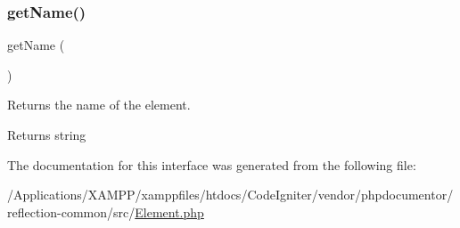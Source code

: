 \subsubsection{\texorpdfstring{get\+Name()}{getName()}}
{\footnotesize\ttfamily get\+Name (\begin{DoxyParamCaption}{ }\end{DoxyParamCaption})}

Returns the name of the element.

\begin{DoxyReturn}{Returns}
string 
\end{DoxyReturn}


The documentation for this interface was generated from the following file\+:\begin{DoxyCompactItemize}
\item 
/\+Applications/\+X\+A\+M\+P\+P/xamppfiles/htdocs/\+Code\+Igniter/vendor/phpdocumentor/reflection-\/common/src/\mbox{\hyperlink{_element_8php}{Element.\+php}}\end{DoxyCompactItemize}
